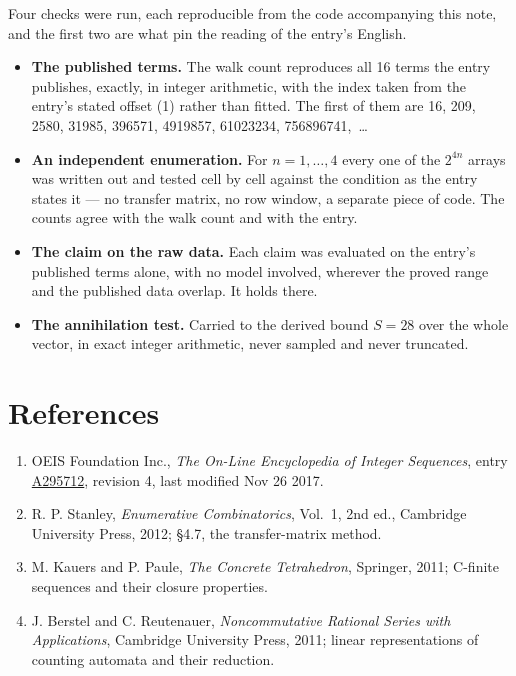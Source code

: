 \documentclass[11pt]{article}
\theoremstyle{definition}
\begin{document}
Four checks were run, each reproducible from the code accompanying this note, and the first two are what pin the reading of the entry's English.

\begin{itemize}

\item {\bfseries The published terms.} The walk count reproduces all 16 terms the entry publishes, exactly, in integer arithmetic, with the index taken from the entry's stated offset (1) rather than fitted. The first of them are 16, 209, 2580, 31985, 396571, 4919857, 61023234, 756896741,~\dots

\item {\bfseries An independent enumeration.} For $n = 1,\dots,4$ every one of the $2^{4n}$ arrays was written out and tested cell by cell against the condition as the entry states it --- no transfer matrix, no row window, a separate piece of code. The counts agree with the walk count and with the entry.

\item {\bfseries The claim on the raw data.} Each claim was evaluated on the entry's published terms alone, with no model involved, wherever the proved range and the published data overlap. It holds there.

\item {\bfseries The annihilation test.} Carried to the derived bound $S = 28$ over the whole vector, in exact integer arithmetic, never sampled and never truncated.

\end{itemize}

\section{References}

\begin{enumerate}

\item OEIS Foundation Inc., \emph{The On-Line Encyclopedia of Integer Sequences}, entry \href{https://oeis.org/A295712}{A295712}, revision 4, last modified Nov 26 2017.

\item R. P. Stanley, \emph{Enumerative Combinatorics}, Vol.~1, 2nd ed., Cambridge University Press, 2012; \S4.7, the transfer-matrix method.

\item M. Kauers and P. Paule, \emph{The Concrete Tetrahedron}, Springer, 2011; C-finite sequences and their closure properties.

\item J. Berstel and C. Reutenauer, \emph{Noncommutative Rational Series with Applications}, Cambridge University Press, 2011; linear representations of counting automata and their reduction.

\end{enumerate}
\end{document}
